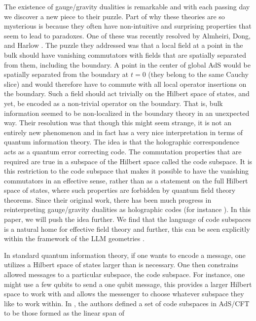 \documentclass[12pt,nofootinbib, longbibliography]{revtex4-1}
\begin{document}
The existence of gauge/gravity dualities \cite{Maldacena:1997re, Witten:1998qj,Gubser:1998bc} is remarkable and with each passing day we discover a new piece to their puzzle. Part of why these theories are so mysterious is because they often have non-intuitive and surprising properties that seem to lead to paradoxes. One of these was recently resolved by Almheiri, Dong, and Harlow \cite{Almheiri:2014lwa}. The puzzle they addressed was that a local field at a point in the bulk should have vanishing commutators with fields that are spatially separated from them, including the boundary. A point in the center of global AdS would be spatially separated from the boundary at $t=0$ (they belong to the same Cauchy slice) and would therefore have to commute with all local operator insertions on the boundary. Such a field should act trivially on the Hilbert space of states, and yet, be encoded as a non-trivial operator on the boundary.  
That is,  bulk information seemed to be non-localized in the boundary theory in an unexpected way. Their resolution was that though this might seem strange, it is not an entirely new phenomenon and in fact has a very nice interpretation in terms of quantum information theory.  The idea is that the holographic correspondence acts as a quantum error correcting code. The commutation properties that are required are true in a subspace of the Hilbert space called the code subspace. It is this restriction to the code subspace that makes it possible to have the vanishing commutators in an effective sense, rather than as a statement on the full Hilbert space of states, where such properties are forbidden by quantum field theory theorems.
Since their original work, there has been much progress in reinterpreting gauge/gravity dualities as holographic codes (for instance \cite{Mintun:2015qda, Pastawski:2015qua, Freivogel:2016zsb}). In this paper, we will push the idea further. We find that the language of code subspaces is a natural home for effective field theory and further, this can be seen explicitly within the framework of the LLM geometries \cite{Lin:2004nb}.

In standard quantum information theory, if one wants to encode a message, one utilizes a Hilbert space of states larger  than is necessary. One then constrains allowed messages to a particular subspace, the code subspace. For instance, one might use a few qubits to send a one qubit message, this provides a larger Hilbert space to work with and allows the messenger to choose whatever subspace they like to work within. In \cite{Almheiri:2014lwa}, the authors defined a set of code subspaces in AdS/CFT to be those formed as the linear span of
\end{document}
